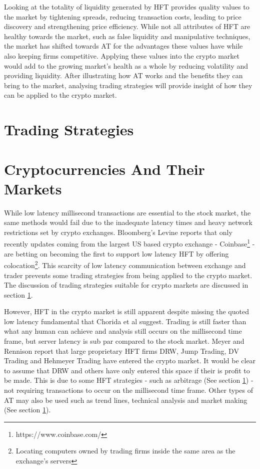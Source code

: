 Looking at the totality of liquidity generated by HFT provides quality values to the market by tightening spreads, reducing transaction costs, leading to price discovery and strengthening price efficiency. While not all attributes of HFT are healthy towards the market, such as false liquidity and manipulative techniques, the market has shifted towards AT for the advantages these values have while also keeping firms competitive. Applying these values into the crypto market would add to the growing market's health as a whole by reducing volatility and providing liquidity. After illustrating how AT works and the benefits they can bring to the market, analysing trading strategies will provide insight of how they can be applied to the crypto market.




\section{Trading Strategies}
\label{sec:related:tradingStrategies}


\section{Cryptocurrencies And Their Markets}
\label{sec:related:cryptoAndTheirMarkets}
While low latency millisecond transactions are essential to the stock market, the same methods would fail due to the inadequate latency times and heavy network restrictions set by crypto exchanges. Bloomberg's Levine reports \cite{WEB:Levine:2018} that only recently updates coming from the largest US based crypto exchange - Coinbase\footnote{https://www.coinbase.com/} - are betting on becoming the first to support low latency HFT by offering colocation\footnote{Locating computers owned by trading firms inside the same area as the exchange's servers}. This scarcity of low latency communication between exchange and trader prevents some trading strategies from being applied to the crypto market. The discussion of trading strategies suitable for crypto markets are discussed in section \ref{sec:related:tradingStrategies}.

However, HFT in the crypto market is still apparent despite missing the quoted low latency fundamental that Chorida et al \cite{REPORT:ChordiaEtAl:2013} suggest. Trading is still faster than what any human can achieve and analysis still occurs on the millisecond time frame, but server latency is sub par compared to the stock market. Meyer and Rennison \cite{ART:Meyer:2017} report that large proprietary HFT firms DRW, Jump Trading, DV Trading and Hehmeyer Trading have entered the crypto market. It would be clear to assume that DRW and others have only entered this space if their is profit to be made. This is due to some HFT strategies - such as arbitrage (See section \ref{sec:related:tradingStrategies}) - not requiring transactions to occur on the millisecond time frame. Other types of AT may also be used such as trend lines, technical analysis and market making (See section \ref{sec:related:tradingStrategies}). 


